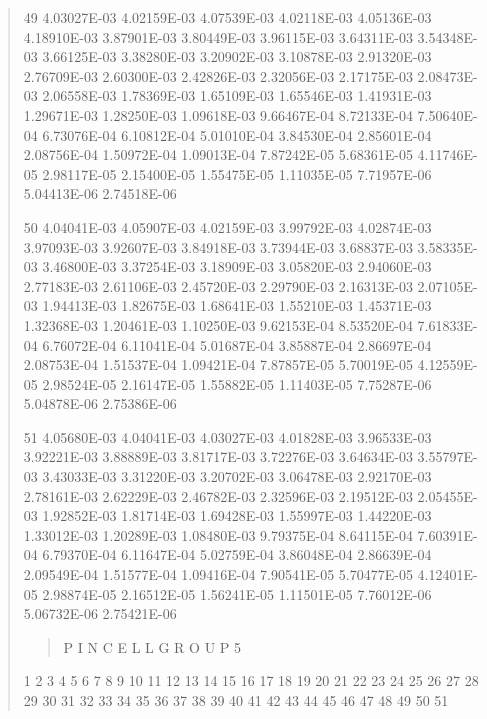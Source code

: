 \documentclass[letterpaper,10pt,english]{sphinxmanual}
\begin{document}
\begin{quote}
\begin{DUlineblock}{0em}
\item[] 49   4.03027E-03  4.02159E-03  4.07539E-03  4.02118E-03  4.05136E-03  4.18910E-03  3.87901E-03  3.80449E-03  3.96115E-03  3.64311E-03  3.54348E-03  3.66125E-03  3.38280E-03  3.20902E-03  3.10878E-03  2.91320E-03  2.76709E-03  2.60300E-03  2.42826E-03  2.32056E-03  2.17175E-03  2.08473E-03  2.06558E-03  1.78369E-03  1.65109E-03  1.65546E-03  1.41931E-03  1.29671E-03  1.28250E-03  1.09618E-03  9.66467E-04  8.72133E-04  7.50640E-04  6.73076E-04  6.10812E-04  5.01010E-04  3.84530E-04  2.85601E-04  2.08756E-04  1.50972E-04  1.09013E-04  7.87242E-05  5.68361E-05  4.11746E-05  2.98117E-05  2.15400E-05  1.55475E-05  1.11035E-05  7.71957E-06  5.04413E-06  2.74518E-06
\item[] 50   4.04041E-03  4.05907E-03  4.02159E-03  3.99792E-03  4.02874E-03  3.97093E-03  3.92607E-03  3.84918E-03  3.73944E-03  3.68837E-03  3.58335E-03  3.46800E-03  3.37254E-03  3.18909E-03  3.05820E-03  2.94060E-03  2.77183E-03  2.61106E-03  2.45720E-03  2.29790E-03  2.16313E-03  2.07105E-03  1.94413E-03  1.82675E-03  1.68641E-03  1.55210E-03  1.45371E-03  1.32368E-03  1.20461E-03  1.10250E-03  9.62153E-04  8.53520E-04  7.61833E-04  6.76072E-04  6.11041E-04  5.01687E-04  3.85887E-04  2.86697E-04  2.08753E-04  1.51537E-04  1.09421E-04  7.87857E-05  5.70019E-05  4.12559E-05  2.98524E-05  2.16147E-05  1.55882E-05  1.11403E-05  7.75287E-06  5.04878E-06  2.75386E-06
\item[] 51   4.05680E-03  4.04041E-03  4.03027E-03  4.01828E-03  3.96533E-03  3.92221E-03  3.88889E-03  3.81717E-03  3.72276E-03  3.64634E-03  3.55797E-03  3.43033E-03  3.31220E-03  3.20702E-03  3.06478E-03  2.92170E-03  2.78161E-03  2.62229E-03  2.46782E-03  2.32596E-03  2.19512E-03  2.05455E-03  1.92852E-03  1.81714E-03  1.69428E-03  1.55997E-03  1.44220E-03  1.33012E-03  1.20289E-03  1.08480E-03  9.79375E-04  8.64115E-04  7.60391E-04  6.79370E-04  6.11647E-04  5.02759E-04  3.86048E-04  2.86639E-04  2.09549E-04  1.51577E-04  1.09416E-04  7.90541E-05  5.70477E-05  4.12401E-05  2.98874E-05  2.16512E-05  1.56241E-05  1.11501E-05  7.76012E-06  5.06732E-06  2.75421E-06
\end{DUlineblock}
\begin{quote}

P I N  C E L L       G R O U P 5
\end{quote}

\begin{DUlineblock}{0em}
\item[] 1        2        3        4        5        6        7        8        9           10           11           12           13           14           15           16           17           18           19           20           21           22           23           24           25           26           27           28           29           30           31           32           33           34           35           36           37           38           39           40           41           42           43           44           45           46           47           48           49           50           51
\end{DUlineblock}


\end{quote}
\end{document}
